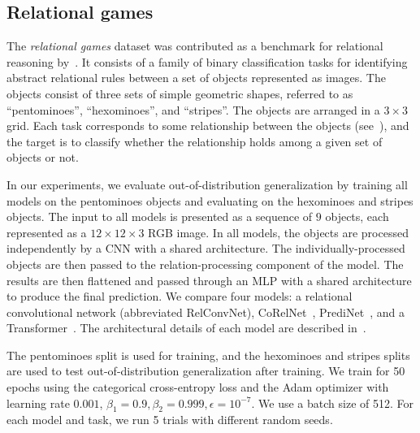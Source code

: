 \subsection{Relational games}\label{ssec:exp_relational_games}

The \textit{relational games} dataset was contributed as a benchmark for relational reasoning by~\citep{shanahanExplicitlyRelationalNeural}. It consists of a family of binary classification tasks for identifying abstract relational rules between a set of objects represented as images. The objects consist of three sets of simple geometric shapes, referred to as ``pentominoes'', ``hexominoes'', and ``stripes''. The objects are arranged in a $3 \times 3$ grid. Each task corresponds to some relationship between the objects (see~), and the target is to classify whether the relationship holds among a given set of objects or not.

In our experiments, we evaluate out-of-distribution generalization by training all models on the pentominoes objects and evaluating on the hexominoes and stripes objects. The input to all models is presented as a sequence of $9$ objects, each represented as a $12 \times 12 \times 3$ RGB image. In all models, the objects are processed independently by a CNN with a shared architecture. The individually-processed objects are then passed to the relation-processing component of the model. The results are then flattened and passed through an MLP with a shared architecture to produce the final prediction. We compare four models: a relational convolutional network (abbreviated RelConvNet), CoRelNet~\citep{kergNeuralArchitecture2022}, PrediNet~\citep{shanahanExplicitlyRelationalNeural}, and a Transformer~\citep{vaswani2017attention}. The architectural details of each model are described in~.

The pentominoes split is used for training,
and the hexominoes and stripes splits are used to test out-of-distribution generalization after training. We train for 50 epochs using the categorical cross-entropy loss and the Adam optimizer with learning rate $0.001$, $\beta_1 = 0.9, \beta_2 = 0.999, \epsilon = 10^{-7}$. We use a batch size of 512. For each model and task, we run 5 trials with different random seeds.

